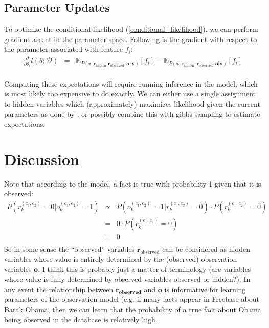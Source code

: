 \documentclass[12pt]{article}
\begin{document}
\subsection{Parameter Updates}
To optimize the conditional likelihood (\ref{conditional_likelihood}), we can perform gradient ascent in the parameter space.  Following is the gradient with respect
to the parameter associated with feature $f_i$:
\begin{eqnarray*}
  \frac{\partial}{\partial \theta_i} l(\theta:\mathcal{D}) & = & \mathbf{E}_{P(\mathbf{z},\mathbf{r}_{\text{hidden}}|\mathbf{r}_{\text{observed}}, \mathbf{o}, \mathbf{x})}[f_i] - \mathbf{E}_{P(\mathbf{z},\mathbf{r}_{\text{hidden}}, \mathbf{r}_{\text{observed}}, \mathbf{o} | \mathbf{x})}[f_i] \\
\end{eqnarray*}

Computing these expectations will require running inference in the model, which is most likely too expensive to do exactly.
We can either use a single assignment to hidden variables which (approximately) maximizes likelihood given the current parameters as done by \cite{Hoffmann11}, or possibly
combine this with gibbs sampling to estimate expectations.

\section{Discussion}
Note that according to the model, a fact is true with probability 1 given that it is observed:
\begin{eqnarray*}
P(r^{(e_1,e_2)}_k=0|o^{(e_1,e_2)}_k=1) & \propto & P(o^{(e_1,e_2)}_k=1|r^{(e_1,e_2)}_k=0) \cdot P(r^{(e_1,e_2)}_k=0) \\
& = & 0 \cdot P(r^{(e_1,e_2)}_k=0) \\
& = & 0 \\
\end{eqnarray*}
So in some sense the ``observed'' variables $\mathbf{r}_{\text{observed}}$ can be considered as hidden variables whose value is entirely determined by the (observed) observation variables $\mathbf{o}$.
I think this is probably just a matter of terminology (are variables whose value is fully determined by observed variables observed or hidden?).  In any event the relationship between
$\mathbf{r_\text{observed}}$ and $\mathbf{o}$ is informative for learning parameters of the observation model (e.g. if many facts appear in Freebase about Barak Obama, then we can learn that the probability of a
true fact about Obama being observed in the database is relatively high.
\end{document}
